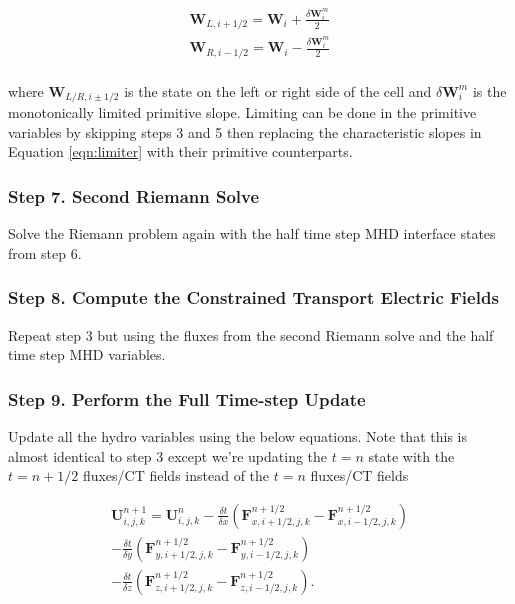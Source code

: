    \begin{equation}
        \begin{aligned}
            \boldsymbol{W}_{L, i+1/2} = \boldsymbol{W}_{i} + \frac{\delta \boldsymbol{W}_{i}^m}{2} \\
            \boldsymbol{W}_{R, i-1/2} = \boldsymbol{W}_{i} - \frac{\delta \boldsymbol{W}_{i}^m}{2} \\
        \end{aligned}
    \end{equation}

    where $ \boldsymbol{W}_{L/R, i\pm1/2} $ is the state on the left or right side
    of the cell and $ \delta \boldsymbol{W}_{i}^m $ is the monotonically limited
    primitive slope. Limiting can be done in the primitive variables by skipping steps 3 and 5 then replacing the characteristic slopes in Equation \ref{eqn:limiter} with their primitive counterparts.

\subsubsection{Step 7. Second Riemann Solve}
\label{vlct:2nd-riemann-solve}

Solve the Riemann problem again with the half time step MHD interface states from step 6.

\subsubsection{Step 8. Compute the Constrained Transport Electric Fields}
\label{vlct:2nd-emf}

Repeat step 3 but using the fluxes from the second Riemann solve and the half time step MHD variables.

\subsubsection{Step 9. Perform the Full Time-step Update}
\label{vlct:full-dt-update}

Update all the hydro variables using the below equations. Note that this is almost identical to step 3 except we're updating the $ t = n $ state with the $ t=n+1/2 $ fluxes/CT fields instead of the $ t=n $ fluxes/CT fields

\begin{equation}
    \begin{aligned}
        \boldsymbol{U}^{n+1}_{i,j,k} = \boldsymbol{U}^{n}_{i,j,k}
        - \frac{\delta t}{\delta x} \left( \boldsymbol{F}^{n+1/2}_{x,i+1/2,j,k} - \boldsymbol{F}^{n+1/2}_{x,i-1/2,j,k} \right) \\
        - \frac{\delta t}{\delta y} \left( \boldsymbol{F}^{n+1/2}_{y,i+1/2,j,k} - \boldsymbol{F}^{n+1/2}_{y,i-1/2,j,k} \right) \\
        - \frac{\delta t}{\delta z} \left( \boldsymbol{F}^{n+1/2}_{z,i+1/2,j,k} - \boldsymbol{F}^{n+1/2}_{z,i-1/2,j,k} \right).
    \end{aligned}
\end{equation}

